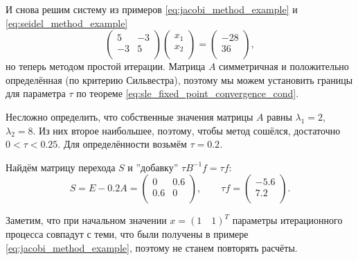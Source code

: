 \documentclass{article}
\begin{document}
\begin{example}
	И снова решим систему из примеров \eqref{eq:jacobi_method_example} и
	\eqref{eq:seidel_method_example}
	\[
		\begin{pmatrix}
			5	& -3 \\
			-3	& 5  \\
		\end{pmatrix}
		\begin{pmatrix}
			x_1 \\
			x_2 \\
		\end{pmatrix}
		=
		\begin{pmatrix}
			-28 \\
			36  \\
		\end{pmatrix}
		,
	\]
	но теперь методом простой итерации. Матрица $A$ симметричная и
	положительно определённая (по критерию Сильвестра), поэтому мы можем
	установить границы для параметра $\tau$ по теореме
	\eqref{eq:sle_fixed_point_convergence_cond}.

	Несложно определить, что собственные значения матрицы $A$ равны
	$\lambda_1=2$, $\lambda_2=8$. Из них второе наибольшее, поэтому,
	чтобы метод сошёлся, достаточно $0<\tau<0.25$. Для определённости
	возьмём $\tau=0.2$.

	Найдём матрицу перехода $S$ и ''добавку'' $\tau B^{-1}f=\tau f$:
	\[S=E-0.2A=
		\begin{pmatrix}
			0	& 0.6 \\
			0.6	& 0   \\
		\end{pmatrix}
		,\qquad
		\tau f=
		\begin{pmatrix}
			-5.6 \\
			7.2  \\
		\end{pmatrix}
		.
	\]

	Заметим, что при начальном значении $x=(1\quad 1)^T$ параметры
	итерационного процесса совпадут с теми, что были получены в примере
	\eqref{eq:jacobi_method_example}, поэтому не станем повторять расчёты.
\end{example}
\end{document}
